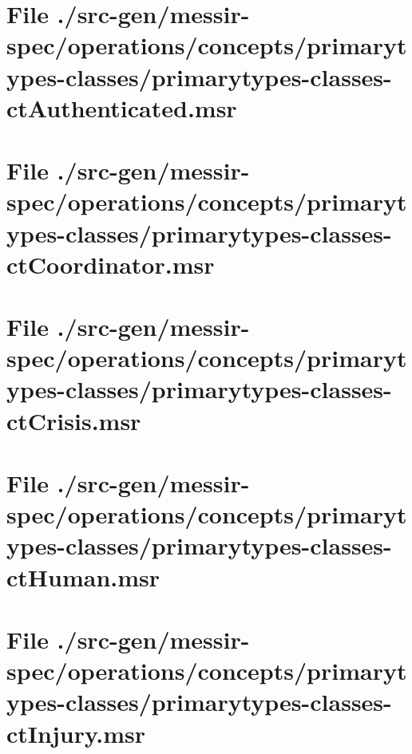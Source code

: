 \section[File /src-gen/messir-spec.../primarytypes-classes-ctAuthenticated.msr]{File ./src-gen/messir-spec/operations/concepts/primarytypes-classes/primarytypes-classes-ctAuthenticated.msr}
\scriptsize

\normalsize
	
\section[File /src-gen/messir-spec/operations.../primarytypes-classes-ctCoordinator.msr]{File ./src-gen/messir-spec/operations/concepts/primarytypes-classes/primarytypes-classes-ctCoordinator.msr}
\scriptsize

\normalsize
	
\section[File /src-gen/messir-spec/operations.../primarytypes-classes-ctCrisis.msr]{File ./src-gen/messir-spec/operations/concepts/primarytypes-classes/primarytypes-classes-ctCrisis.msr}
\scriptsize

\normalsize
	
\section[File /src-gen/messir-spec/operations.../primarytypes-classes-ctHuman.msr]{File ./src-gen/messir-spec/operations/concepts/primarytypes-classes/primarytypes-classes-ctHuman.msr}
\scriptsize

\normalsize
	
\section[File /src-gen/messir-spec/operations.../primarytypes-classes-ctInjury.msr]{File ./src-gen/messir-spec/operations/concepts/primarytypes-classes/primarytypes-classes-ctInjury.msr}
\scriptsize

\normalsize
	
